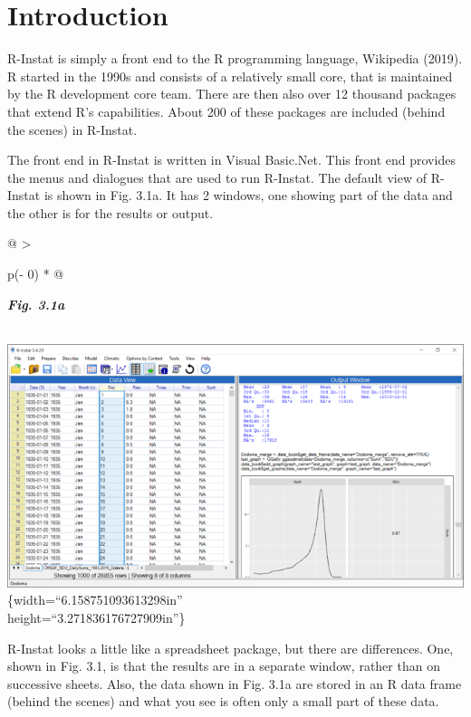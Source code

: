 \documentclass[
  letterpaper,
  DIV=11,
  numbers=noendperiod]{scrreprt}
\begin{document}
\section{Introduction}\label{introduction-1}

R-Instat is simply a front end to the R programming language, Wikipedia
(2019). R started in the 1990s and consists of a relatively small core,
that is maintained by the R development core team. There are then also
over 12 thousand packages that extend R's capabilities. About 200 of
these packages are included (behind the scenes) in R-Instat.

The front end in R-Instat is written in Visual Basic.Net. This front end
provides the menus and dialogues that are used to run R-Instat. The
default view of R-Instat is shown in Fig. 3.1a. It has 2 windows, one
showing part of the data and the other is for the results or output.

\begin{longtable}[]{@{}
  >{\raggedright\arraybackslash}p{(\columnwidth - 0\tabcolsep) * }@{}}
\toprule\noalign{}
\begin{minipage}[b]{\linewidth}\raggedright
\textbf{\emph{Fig. 3.1a}}
\end{minipage} \\
\midrule\noalign{}
\endhead
\bottomrule\noalign{}
\endlastfoot
\includegraphics{figures/Fig3.1a.png}\{width=``6.158751093613298in'' \\
height=``3.271836176727909in''\} \\
\end{longtable}

R-Instat looks a little like a spreadsheet package, but there are
differences. One, shown in Fig. 3.1, is that the results are in a
separate window, rather than on successive sheets. Also, the data shown
in Fig. 3.1a are stored in an R data frame (behind the scenes) and what
you see is often only a small part of these data.
\end{document}
